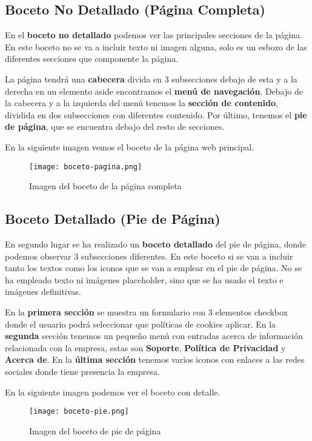 \subsection{Boceto No Detallado (Página Completa)}

En el \textbf{boceto no detallado} podemos ver las principales secciones de la página. En este boceto no se va a incluir texto ni imagen alguna, solo es un esbozo de las diferentes secciones que componente la página.

La página tendrá una \textbf{cabecera} divida en 3 subsecciones debajo de esta y a la derecha en un elemento aside encontramos el \textbf{menú de navegación}. Debajo de la cabecera y a la izquierda del menú tenemos la \textbf{sección de contenido}, dividida en dos subsecciones con diferentes contenido. Por último, tenemos el \textbf{pie de página}, que se encuentra debajo del resto de secciones.

En la siguiente imagen vemos el boceto de la página web principal.

\begin{figure}[H]
    \centering
    \texttt{[image: boceto-pagina.png]}
    \caption{Imagen del boceto de la página completa}
\end{figure}

\subsection{Boceto Detallado (Pie de Página)}

En segundo lugar se ha realizado un \textbf{boceto detallado} del pie de página, donde podemos observar 3 subsecciones diferentes. En este boceto si se van a incluir tanto los textos como los iconos que se van a emplear en el pie de página. No se ha empleado texto ni imágenes placeholder, sino que se ha usado el texto e imágenes definitivas.

En la \textbf{primera sección} se muestra un formulario con 3 elementos checkbox donde el usuario podrá seleccionar que políticas de cookies aplicar. En la \textbf{segunda} sección tenemos un pequeño menú con entradas acerca de información relacionada con la empresa, estas son \textbf{Soporte}, \textbf{Política de Privacidad} y \textbf{Acerca de}. En la \textbf{última sección} tenemos varios iconos con enlaces a las redes sociales donde tiene presencia la empresa.

En la siguiente imagen podemos ver el boceto con detalle.
\begin{figure}[H]
    \centering
    \texttt{[image: boceto-pie.png]}
    \caption{Imagen del boceto de pie de página}
\end{figure}

